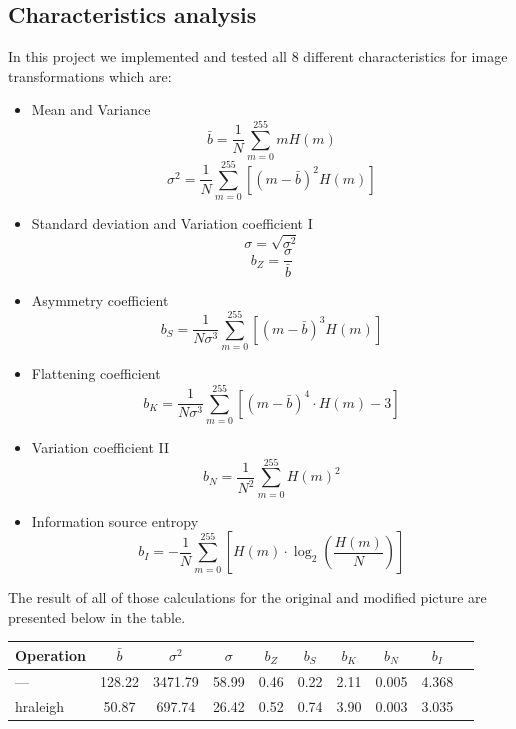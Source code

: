 \documentclass[12pt]{article}
\begin{document}
\subsection{Characteristics analysis}

In this project we implemented and tested all 8 different characteristics for image transformations which are:
\begin{itemize}
    \item Mean and Variance
          \[
              \bar{b} = \frac{1}{N}\sum\limits_{m=0}^{255} m H(m)
          \]
          \[
              \sigma^2 = \frac{1}{N}
              \sum\limits_{m=0}^{255} \left[ \left(m-\bar{b}\right)^2 H(m) \right]
          \]
    \item Standard deviation and Variation coefficient I
          \[
              \sigma =\sqrt{\sigma^{2}}
          \]
          \[
              b_Z= \frac{\sigma}{\bar{b}}
          \]
    \item Asymmetry coefficient
          \[
              b_S = \frac{1}{N\sigma^3}
              \sum\limits_{m=0}^{255} \left[ \left(m-\bar{b}\right)^3 H(m) \right]
          \]
    \item Flattening coefficient
          \[
              b_K = \frac{1}{N\sigma^3}
              \sum\limits_{m=0}^{255} \left[ \left(m-\bar{b}\right)^4 \cdot H(m)-3 \right]
          \]
    \item Variation coefficient II
          \[
              b_N = \frac{1}{N^2}
              \sum\limits_{m=0}^{255} H(m)^2
          \]
    \item Information source entropy
          \[
              b_I = -\frac{1}{N}
              \sum\limits_{m=0}^{255} \left[ H(m) \cdot \log_2\left(\frac{H(m)}{N}\right) \right]
          \]
\end{itemize}

The result of all of those calculations for the original and modified picture are presented below in the table.

\begin{table}[H]\centering
    \begin{tabular}{l|ccccccccc}
        \toprule
        Operation & $\bar{b}$ & $\sigma^2$ & $\sigma$ & $b_Z$ & $b_S$ & $b_K$ & $b_N$ & $b_I$ \\
        \midrule
        ---       & 128.22    & 3471.79    & 58.99    & 0.46  & 0.22  & 2.11  & 0.005 & 4.368 \\[1ex]
        hraleigh  & 50.87     & 697.74     & 26.42    & 0.52  & 0.74  & 3.90  & 0.003 & 3.035 \\
        \bottomrule
    \end{tabular}
\end{table}
\end{document}

